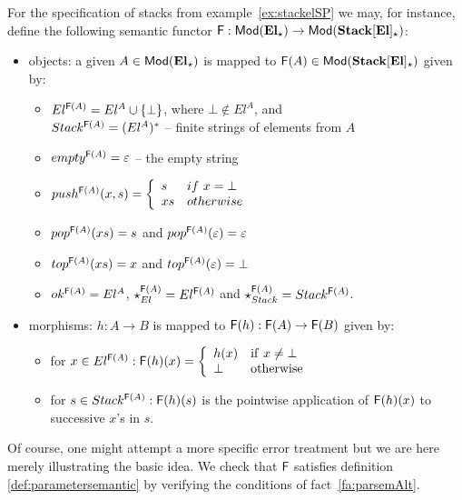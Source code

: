 \begin{example}\label{ex:stackelSem}
For the specification of stacks from example~\ref{ex:stackelSP} we may, for
instance, define the following semantic functor
${\sf {F}}:{\sf {Mod}}({\bf El}_\star)\to{\sf {Mod}}({\bf Stack[El]_\star})$: 
\begin{itemize}\MyLPar
\item objects: a given $A\in{\sf {Mod}}({\bf El}_\star)$ is mapped to
${\sf {F}}(A)\in{\sf {Mod}}({\bf Stack[El]_\star})$ given by:
\begin{itemize}\MyLPar
 \item $El^{{\sf {F}}(A)} = El^A\cup\{\bot\}$, where $\bot\not\in El^A$, and \\
  $Stack^{{\sf {F}}(A)} = (El^{A})^*$ -- finite strings of elements from $A$
 \item $empty^{{\sf {F}}(A)}=\varepsilon$ -- the empty string
 \item $push^{{\sf {F}}(A)}(x,s) = \left\{\begin{array}{ll}s & if\ x=\bot\\ xs &
  otherwise\end{array}\right.$
 \item $pop^{{\sf {F}}(A)}(xs) = s$ and $pop^{{\sf {F}}(A)}(\varepsilon)=\varepsilon$
 \item $top^{{\sf {F}}(A)}(xs) = x$ and $top^{{\sf {F}}(A)}(\varepsilon)=\bot$
 \item $ok^{{\sf {F}}(A)} = El^{A}$, $\star_{El}^{{\sf {F}}(A)} = El^{{\sf {F}}(A)}$
  and $\star_{Stack}^{{\sf {F}}(A)} = Stack^{{\sf {F}}(A)}$.
\end{itemize}
\item morphisms: $h:A\to B$ is mapped to ${\sf {F}}(h):{\sf {F}}(A)\to {\sf {F}}(B)$
given by: 
 \begin{itemize}\MyLPar
 \item for $x\in El^{{\sf {F}}(A)}: {\sf {F}}(h)(x) = \left\{\begin{array}{ll} h(x) 
 & {\rm if\ }x\not= \bot \\ \bot & {\rm otherwise}
 \end{array}\right.$
 \item  for $s\in Stack^{{\sf {F}}(A)}: {\sf {F}}(h)(s)$ is the pointwise 
 application of ${\sf {F}}(h)(x)$ to successive $x$'s in $s$. 
 \end{itemize} 
\end{itemize} 
Of course, one might attempt a more specific error treatment but we are here
merely illustrating the basic idea. 
We check that ${\sf {F}}$ satisfies 
definition \ref{def:parametersemantic} by verifying the
conditions of fact~\ref{fa:parsemAlt}. 


\end{example}

